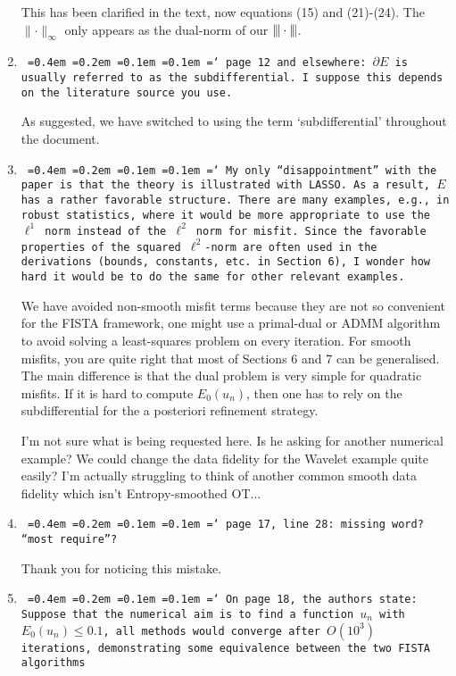 \documentclass[12pt]{article}
\newcommand*\justify{%
	\fontdimen2\font=0.4em%
	\fontdimen3\font=0.2em%
	\fontdimen4\font=0.1em%
	\fontdimen7\font=0.1em%
	\hyphenchar\font=`\-%
}
\newcommand{\review}[1]{\texttt{\justify{#1}}}
\newcommand{\todo}[1]{{\color{red} #1}}
\begin{document}
\begin{enumerate}
	This has been clarified in the text, now equations (15) and (21)-(24). The $\lVert\cdot\rVert_\infty$ only appears as the dual-norm of our ${\vert\kern-0.25ex\vert\kern-0.25ex\vert \cdot \vert\kern-0.25ex\vert\kern-0.25ex\vert}$.
	
	\item \review{page 12 and elsewhere: $\partial E$ is usually referred to as the subdifferential. I suppose this depends on the literature source you use.}
	
	As suggested, we have switched to using the term `subdifferential' throughout the document.
	
	\item \review{My only ``disappointment'' with the paper is that the theory is illustrated with LASSO. As a result, $E$ has a rather favorable structure. There are many examples, e.g., in robust statistics, where it would be more appropriate to use the $\ell^1$ norm instead of the $\ell^2$ norm for misfit. Since the favorable properties of the squared $\ell^2$-norm are often used in the derivations (bounds, constants, etc. in Section 6), I wonder how hard it would be to do the same for other relevant examples.}
	
	We have avoided non-smooth misfit terms because they are not so convenient for the FISTA framework, one might use a primal-dual or ADMM algorithm to avoid solving a least-squares problem on every iteration. For smooth misfits, you are quite right that most of Sections 6 and 7 can be generalised. The main difference is that the dual problem is very simple for quadratic misfits. If it is hard to compute $E_0(u_n)$, then one has to rely on the subdifferential for the a posteriori refinement strategy.
	
	\todo{I'm not sure what is being requested here. Is he asking for another numerical example? We could change the data fidelity for the Wavelet example quite easily? I'm actually struggling to think of another common smooth data fidelity which isn't Entropy-smoothed OT...}
	
	\item \review{page 17, line 28: missing word? ``most require''?}
	
	Thank you for noticing this mistake.
	
	\item \review{On page 18, the authors state: Suppose that the numerical aim is to find a function $u_n$ with $E_0(u_n)\leq 0.1$, all methods would converge after $O(10^3)$ iterations, demonstrating some equivalence between the two FISTA algorithms}
	

\end{enumerate}
\end{document}

